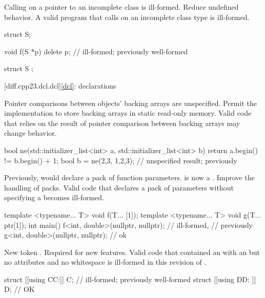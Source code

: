 \change
Calling  on a pointer to an incomplete class is ill-formed.
\rationale
Reduce undefined behavior.
\effect
A valid \CppXXIII{} program that calls  on an incomplete
class type is ill-formed.
\begin{example}
\begin{codeblock}
struct S;

void f(S *p) {
  delete p;             // ill-formed; previously well-formed
}

struct S {};
\end{codeblock}
\end{example}

[diff.cpp23.dcl.dcl]{\ref*{dcl}: declarations}

\change
Pointer comparisons between  objects' backing arrays
are unspecified.
\rationale
Permit the implementation to store backing arrays in static read-only memory.
\effect
Valid \CppXXIII{} code
that relies on the result of pointer comparison between backing arrays
may change behavior.
\begin{example}
\begin{codeblock}
bool ne(std::initializer_list<int> a, std::initializer_list<int> b) {
  return a.begin() != b.begin() + 1;
}
bool b = ne({2,3}, {1,2,3});    // unspecified result; previously 
\end{codeblock}
\end{example}

\change
Previously,  would declare a pack of function parameters.
 is now a .
\rationale
Improve the handling of packs.
\effect
Valid \CppXXIII{} code that declares a pack of parameters
without specifying a  becomes ill-formed.
\begin{example}
\begin{codeblock}
template <typename... T>
void f(T... [1]);
template <typename... T>
void g(T... ptr[1]);
int main() {
  f<int, double>(nullptr, nullptr);     // ill-formed,
                                        // previously 
  g<int, double>(nullptr, nullptr);     // ok
}
\end{codeblock}
\end{example}

\change
New token \tcode{:]}.
\rationale
Required for new features.
\effect
Valid \CppXXIII{} code that contained an 
with an 
but no attributes and no whitespace is ill-formed in this revision of \Cpp{}.
\begin{example}
\begin{codeblock}
struct [[using CC:]] C;                 // ill-formed; previously well-formed
struct [[using DD: ]] D;                // OK
\end{codeblock}
\end{example}

